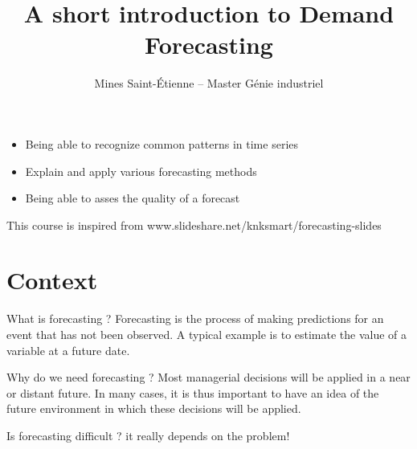 \documentclass{beamer}
\title[Short intro to Demand Forecasting]{A short introduction to Demand Forecasting}
\author[Mines Saint-\'Etienne]{Mines Saint-\'Etienne -- Master Génie industriel}
\institute[2016-2017]{\texorpdfstring{Nicolas Durrande (durrande@emse.fr)}{}}
\date{\null}
\begin{document}
\begin{frame}
  \titlepage
\end{frame}

\begin{frame}{}
\begin{itemize}
	\item Being able to recognize common patterns in time series
	\item Explain and apply various forecasting methods
	\item Being able to asses the quality of a forecast
\end{itemize}
This course is inspired from www.slideshare.net/knksmart/forecasting-slides \\ \vspace{5mm}
\end{frame}


\section{Context}

\begin{frame}{}
\begin{block}{What is forecasting ?}
Forecasting is the process of making predictions for an event that has not been observed. A typical example is to estimate the value of a variable at a future date.
\end{block}

\begin{block}{Why do we need forecasting ?}
Most managerial decisions will be applied in a near or distant future. In many cases, it is thus important to have an idea of the future environment in which these decisions will be applied.
\end{block}

\begin{block}{Is forecasting difficult ?}
it really depends on the problem!
\end{block}

\end{frame}
\end{document}
